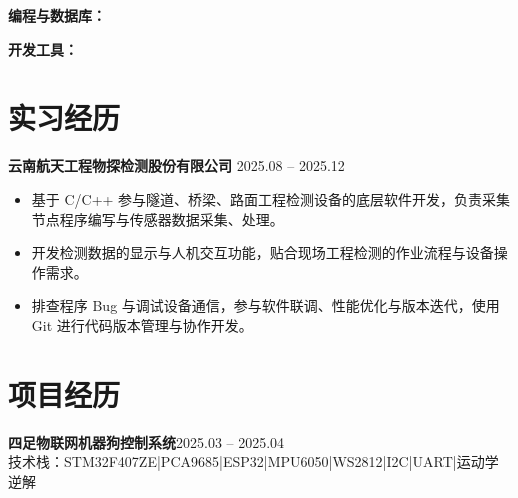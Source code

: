 \documentclass[10pt,a4paper]{article}
\newcommand{\projectblock}[3]{%
    {\bfseries\color{darktext}#1}\hfill{\color{graytext}#2}\\%
    {\small\color{graytext}#3}%
    \vspace{0.2em}%
}
\begin{document}
{\bfseries\color{primary}编程与数据库：}

\vspace{2pt}

{\bfseries\color{primary}开发工具：}

\section{\faBriefcase\hspace{0.4em}实习经历}

{\bfseries 云南航天工程物探检测股份有限公司}\hfill{\color{graytext} 2025.08 -- 2025.12}

\vspace{2pt}

\begin{itemize}[leftmargin=1.5em, itemsep=2pt, parsep=0pt, topsep=2pt]
    \item 基于 C/C++ 参与隧道、桥梁、路面工程检测设备的底层软件开发，负责采集节点程序编写与传感器数据采集、处理。
    \item 开发检测数据的显示与人机交互功能，贴合现场工程检测的作业流程与设备操作需求。
    \item 排查程序 Bug 与调试设备通信，参与软件联调、性能优化与版本迭代，使用 Git 进行代码版本管理与协作开发。
\end{itemize}

\vspace{0.15em}

\section{\faProjectDiagram\hspace{0.4em}项目经历}

\projectblock{四足物联网机器狗控制系统}{2025.03 -- 2025.04}{技术栈：STM32F407ZE\hspace{0.3em}|\hspace{0.3em}PCA9685\hspace{0.3em}|\hspace{0.3em}ESP32\hspace{0.3em}|\hspace{0.3em}MPU6050\hspace{0.3em}|\hspace{0.3em}WS2812\hspace{0.3em}|\hspace{0.3em}I2C\hspace{0.3em}|\hspace{0.3em}UART\hspace{0.3em}|\hspace{0.3em}运动学逆解}
\end{document}
